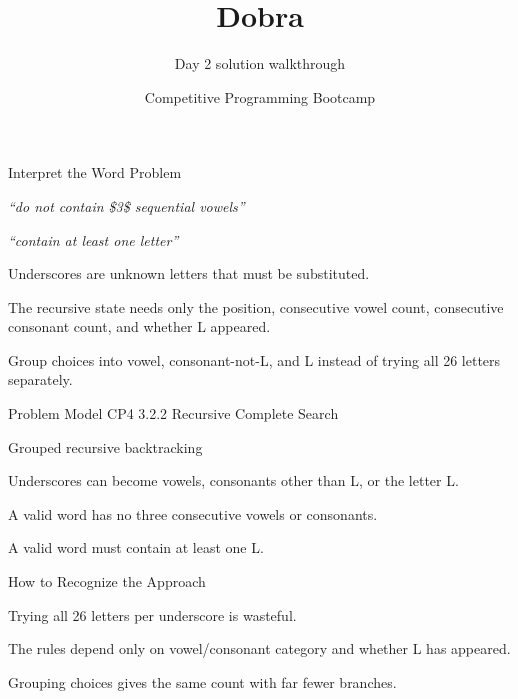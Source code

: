 \documentclass[aspectratio=169,11pt]{beamer}
\title[dobra]{Dobra}
\subtitle{Day 2 solution walkthrough}
\author[Solution Deck]{Competitive Programming Bootcamp}
\date{}
\begin{document}
\begin{frame}[plain]
  \titlepage
\end{frame}

\begin{frame}{Interpret the Word Problem}
\small
{}
\begin{tightitemize}
  \item \textit{``do not contain \$3\$ sequential vowels''}
  \item \textit{``contain at least one letter''}
\end{tightitemize}

\vspace{0.18cm}
\begin{tightitemize}
  \item Underscores are unknown letters that must be substituted.
  \item The recursive state needs only the position, consecutive vowel count, consecutive consonant count, and whether L appeared.
  \item Group choices into vowel, consonant-not-L, and L instead of trying all 26 letters separately.
\end{tightitemize}
\end{frame}







\begin{frame}{Problem Model}
\small
{} CP4 3.2.2 Recursive Complete Search

\vspace{0.25cm}
 Grouped recursive backtracking

\vspace{0.25cm}
\begin{tightitemize}
  \item Underscores can become vowels, consonants other than L, or the letter L.
  \item A valid word has no three consecutive vowels or consonants.
  \item A valid word must contain at least one L.
\end{tightitemize}
\end{frame}

\begin{frame}{How to Recognize the Approach}
\begin{tightitemize}
  \item Trying all 26 letters per underscore is wasteful.
  \item The rules depend only on vowel/consonant category and whether L has appeared.
  \item Grouping choices gives the same count with far fewer branches.
\end{tightitemize}
\end{frame}
\end{document}
